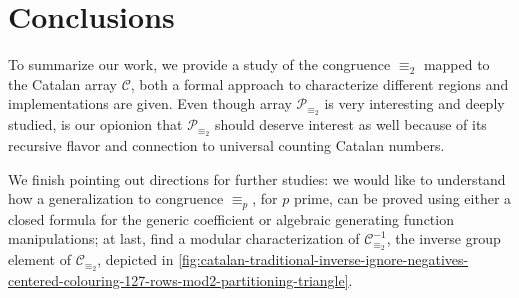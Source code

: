 
\section{Conclusions}
\label{sec:conclusions}


To summarize our work, we provide a study of the congruence $\equiv_{2}$ mapped to the
Catalan array $\mathcal{C}$, both a formal approach to characterize different
regions and implementations are given. Even though array $\mathcal{P}_{\equiv_{2}}$ is very interesting 
and deeply studied, is our opionion that $\mathcal{P}_{\equiv_{2}}$ should deserve interest as well 
because of its recursive flavor and connection to universal counting Catalan numbers.

We finish pointing out directions for further studies: we would like to understand
how a generalization to congruence $\equiv_{p}$, for $p$ prime, can be proved using
either a closed formula for the generic coefficient or algebraic generating function manipulations;
at last, find a modular characterization of $\mathcal{C}_{\equiv_{2}}^{-1}$, the inverse
group element of $\mathcal{C}_{\equiv_{2}}$, depicted in 
\autoref{fig:catalan-traditional-inverse-ignore-negatives-centered-colouring-127-rows-mod2-partitioning-triangle}.


